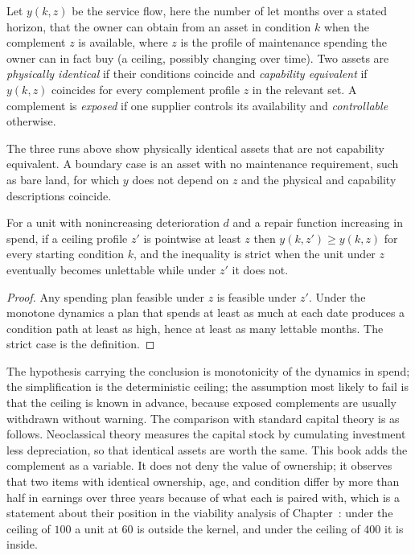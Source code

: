 \begin{definition}\label{def:usable}
Let $y(k,z)$ be the service flow, here the number of let months over a stated horizon, that the owner can obtain from an asset in condition $k$ when the complement $z$ is available, where $z$ is the profile of maintenance spending the owner can in fact buy (a ceiling, possibly changing over time). Two assets are \emph{physically identical} if their conditions coincide and \emph{capability equivalent} if $y(k,z)$ coincides for every complement profile $z$ in the relevant set. A complement is \emph{exposed} if one supplier controls its availability and \emph{controllable} otherwise.
\end{definition}

The three runs above show physically identical assets that are not capability equivalent. A boundary case is an asset with no maintenance requirement, such as bare land, for which $y$ does not depend on $z$ and the physical and capability descriptions coincide.

\begin{proposition}\label{prop:usable-mono}
For a unit with nonincreasing deterioration $d$ and a repair function increasing in spend, if a ceiling profile $z'$ is pointwise at least $z$ then $y(k,z')\ge y(k,z)$ for every starting condition $k$, and the inequality is strict when the unit under $z$ eventually becomes unlettable while under $z'$ it does not.
\end{proposition}

\begin{proof}
Any spending plan feasible under $z$ is feasible under $z'$. Under the monotone dynamics a plan that spends at least as much at each date produces a condition path at least as high, hence at least as many lettable months. The strict case is the definition.
\end{proof}

The hypothesis carrying the conclusion is monotonicity of the dynamics in spend; the simplification is the deterministic ceiling; the assumption most likely to fail is that the ceiling is known in advance, because exposed complements are usually withdrawn without warning. The comparison with standard capital theory is as follows. Neoclassical theory measures the capital stock by cumulating investment less depreciation, so that identical assets are worth the same. This book adds the complement as a variable. It does not deny the value of ownership; it observes that two items with identical ownership, age, and condition differ by more than half in earnings over three years because of what each is paired with, which is a statement about their position in the viability analysis of Chapter~: under the ceiling of $100$ a unit at $60$ is outside the kernel, and under the ceiling of $400$ it is inside.

